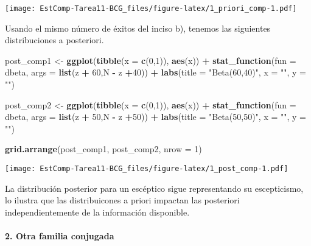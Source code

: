 \documentclass[]{article}
\newenvironment{Shaded}{\begin{snugshade}}{\end{snugshade}}
\newcommand{\DataTypeTok}[1]{\textcolor[rgb]{0.13,0.29,0.53}{#1}}
\newcommand{\DecValTok}[1]{\textcolor[rgb]{0.00,0.00,0.81}{#1}}
\newcommand{\KeywordTok}[1]{\textcolor[rgb]{0.13,0.29,0.53}{\textbf{#1}}}
\newcommand{\NormalTok}[1]{#1}
\newcommand{\OperatorTok}[1]{\textcolor[rgb]{0.81,0.36,0.00}{\textbf{#1}}}
\newcommand{\StringTok}[1]{\textcolor[rgb]{0.31,0.60,0.02}{#1}}
\let\oldparagraph\paragraph
\renewcommand{\paragraph}[1]{\oldparagraph{#1}\mbox{}}
\begin{document}
\texttt{[image: EstComp-Tarea11-BCG\_files/figure-latex/1\_priori\_comp-1.pdf]}

Usando el mismo número de éxitos del inciso b), tenemos las siguientes
distribuciones a posteriori.

\begin{Shaded}
\begin{Highlighting}[]
\NormalTok{post_comp1 <-}\StringTok{ }\KeywordTok{ggplot}\NormalTok{(}\KeywordTok{tibble}\NormalTok{(}\DataTypeTok{x =} \KeywordTok{c}\NormalTok{(}\DecValTok{0}\NormalTok{,}\DecValTok{1}\NormalTok{)), }\KeywordTok{aes}\NormalTok{(x)) }\OperatorTok{+}
\StringTok{  }\KeywordTok{stat_function}\NormalTok{(}\DataTypeTok{fun =}\NormalTok{ dbeta, }\DataTypeTok{args =} \KeywordTok{list}\NormalTok{(z }\OperatorTok{+}\StringTok{ }\DecValTok{60}\NormalTok{,N }\OperatorTok{-}\StringTok{ }\NormalTok{z }\OperatorTok{+}\DecValTok{40}\NormalTok{)) }\OperatorTok{+}
\StringTok{  }\KeywordTok{labs}\NormalTok{(}\DataTypeTok{title =} \StringTok{"Beta(60,40)"}\NormalTok{,}
    \DataTypeTok{x =} \StringTok{""}\NormalTok{,}
    \DataTypeTok{y =} \StringTok{""}\NormalTok{)}

\NormalTok{post_comp2 <-}\StringTok{ }\KeywordTok{ggplot}\NormalTok{(}\KeywordTok{tibble}\NormalTok{(}\DataTypeTok{x =} \KeywordTok{c}\NormalTok{(}\DecValTok{0}\NormalTok{,}\DecValTok{1}\NormalTok{)), }\KeywordTok{aes}\NormalTok{(x)) }\OperatorTok{+}
\StringTok{  }\KeywordTok{stat_function}\NormalTok{(}\DataTypeTok{fun =}\NormalTok{ dbeta, }\DataTypeTok{args =} \KeywordTok{list}\NormalTok{(z }\OperatorTok{+}\StringTok{ }\DecValTok{50}\NormalTok{,N }\OperatorTok{-}\StringTok{ }\NormalTok{z }\OperatorTok{+}\DecValTok{50}\NormalTok{)) }\OperatorTok{+}
\StringTok{  }\KeywordTok{labs}\NormalTok{(}\DataTypeTok{title =} \StringTok{"Beta(50,50)"}\NormalTok{,}
    \DataTypeTok{x =} \StringTok{""}\NormalTok{,}
    \DataTypeTok{y =} \StringTok{""}\NormalTok{)}

\KeywordTok{grid.arrange}\NormalTok{(post_comp1, post_comp2, }\DataTypeTok{nrow =} \DecValTok{1}\NormalTok{)}
\end{Highlighting}
\end{Shaded}

\texttt{[image: EstComp-Tarea11-BCG\_files/figure-latex/1\_post\_comp-1.pdf]}

La distribución posterior para un escéptico sigue representando su
escepticismo, lo ilustra que las distribuicones a priori impactan las
posteriori independientemente de la información disponible.

\hypertarget{otra-familia-conjugada}{%
\paragraph{2. Otra familia conjugada}\label{otra-familia-conjugada}}
\end{document}
